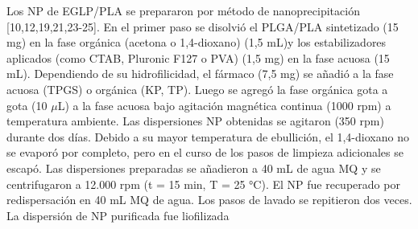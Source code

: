 \documentclass[10pt,letterpaper]{article}
\begin{document}
\begin{multicols}{2}
	Los NP de EGLP/PLA se prepararon    por  método  de nanoprecipitación  [10,12,19,21,23-25]. En  el  primer  paso  se   disolvió   el PLGA/PLA sintetizado  (15 mg)  en  la  fase  orgánica (acetona  o  1,4-dioxano) (1,5  mL)y  los estabilizadores aplicados   (como CTAB,  Pluronic  F127  o  PVA) (1,5 mg) en  la  fase  acuosa  (15  mL).  
	Dependiendo de su  hidrofilicidad,  el  fármaco  (7,5 mg) se   añadió  a  la  fase  acuosa  (TPGS)  o  orgánica  
	(KP, TP). Luego  se  agregó  la  fase  orgánica gota a gota  (10  $\mu$L)  a  la  fase  acuosa  bajo  agitación  magnética  continua  (1000 rpm) a    temperatura ambiente. Las dispersiones  NP  obtenidas  se agitaron   (350 rpm)  durante  dos  días.   Debido  a  su  mayor  temperatura de ebullición,  el  1,4-dioxano  no se evaporó por  completo,  pero  en  el  curso de los pasos de  limpieza  adicionales    se  escapó.   Las  dispersiones preparadas se     añadieron   a 40  mL  de  agua MQ y  se centrifugaron a 12.000 rpm (t = 15 min, T = 25 °C). El  NP  fue  recuperado  por  redispersación en 40  mL  MQ de agua. Los  pasos de  lavado  se repitieron    dos  veces. La dispersión  de NP  purificada  fue  liofilizada
			
		
		
	\end{multicols}
\end{document}
